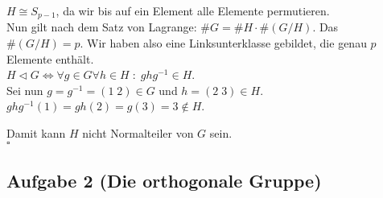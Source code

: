 \documentclass[11pt,a4paper,ngerman]{article}
\begin{document}
$H \cong S_{p-1}$, da wir bis auf ein Element alle Elemente permutieren.\\

Nun gilt nach dem Satz von Lagrange: $\# G = \# H \cdot \# (G / H)$. Das $\# (G / H ) = p$. Wir haben also eine Linksunterklasse gebildet, die genau $p$ Elemente enthält.\\

$H \vartriangleleft G \Leftrightarrow \forall g\in G \forall h \in H \; : \; ghg^{-1} \in H$.\\
Sei nun $g=g^{-1}=(1 \; 2) \in G$ und $h = (2 \; 3) \in H$.\\

$ghg^{-1} (1) = gh (2) = g (3) = 3 \not \in H$.

Damit kann $H$ nicht Normalteiler von $G$ sein.\\
\mbox{} \hfill $\square$


\subsection*{Aufgabe 2 \mdseries (Die orthogonale Gruppe)}
\end{document}
